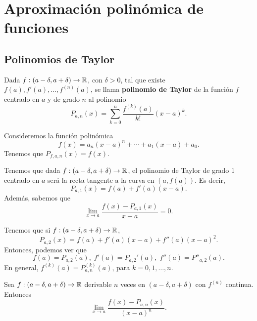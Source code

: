 \chapter{Aproximación polinómica de funciones}
\section{Polinomios de Taylor}
\begin{fdefinition}
\normalfont Dada $\displaystyle f : \left(a-\delta, a + \delta \right)\to \mathbb{R} $, con $\displaystyle \delta > 0 $, tal que existe $\displaystyle f\left(a\right), f'\left(a\right), \ldots, f^{\left(n\right)}\left(a\right) $, se llama \textbf{polinomio de Taylor} de la función $\displaystyle f $ centrado en $\displaystyle a $ y de grado $\displaystyle n $ al polinomio
\[P_{a,n}\left(x\right) = \sum^{n}_{k=0}\frac{f^{\left(k\right)}\left(a\right)}{k!}\left(x-a\right)^{k} .\]
\end{fdefinition}
\begin{eg}
\normalfont Consideremos la función polinómica
\[f\left(x\right) = a_{n}\left(x-a\right)^{n} + \cdots + a_{1}\left(x-a\right) + a_{0} .\]
Tenemos que $\displaystyle P_{f,a,n}\left(x\right) = f\left(x\right) $.
\end{eg}
\begin{observation}
\normalfont Tenemos que dada $\displaystyle f : \left(a-\delta, a + \delta \right)\to \mathbb{R} $, el polinomio de Taylor de grado 1 centrado en $\displaystyle a $ será la recta tangente a la curva en $\displaystyle \left(a,f\left(a\right)\right) $. Es decir,
\[P_{a,1}\left(x\right) = f\left(a\right) + f'\left(a\right)\left(x-a\right) .\]
Además, sabemos que
\[\lim_{x \to a}\frac{f\left(x\right)-P_{a,1}\left(x\right)}{x-a} = 0 .\]
\end{observation}
\begin{observation}
\normalfont Tenemos que si $\displaystyle f : \left(a-\delta, a + \delta \right)\to \mathbb{R} $, 
\[ P_{a,2}\left(x\right) = f\left(a\right) + f'\left(a\right)\left(x-a\right) + f''\left(a\right)\left(x-a\right)^{2} .\]
Entonces, podemos ver que
\[f\left(a\right) = P_{a,2}\left(a\right), \; f'\left(a\right) = P_{a,2}'\left(a\right), \; f''\left(a\right) = P''_{a,2}\left(a\right) .\]
En general, $\displaystyle f^{\left(k\right)}\left(a\right) = P^{\left(k\right)}_{a,n}\left(a\right) $, para $\displaystyle k = 0, 1, \ldots, n $.
\end{observation}
\begin{ftheorem}[]
\normalfont Sea $\displaystyle f: \left(a - \delta, a + \delta \right) \to \mathbb{R} $ derivable $\displaystyle n $ veces en $\displaystyle \left(a - \delta, a + \delta \right) $ con $\displaystyle f^{\left(n\right)} $ continua. Entonces
\[ \lim_{x \to a}\frac{f\left(x\right)-P_{a,n}\left(x\right)}{\left(x-a\right)^{n}} .\]
\end{ftheorem}
